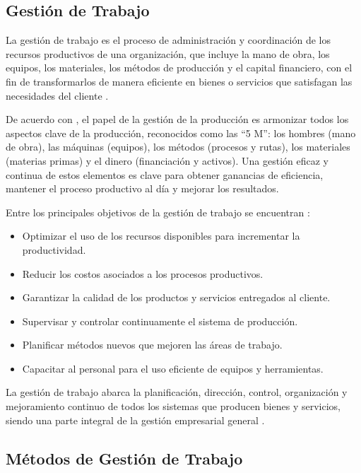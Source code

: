\documentclass[12pt, letterpaper]{article}
\begin{document}
\subsection{Gestión de Trabajo}

La gestión de trabajo es el proceso de administración y coordinación de los recursos productivos de
una organización, que incluye la mano de obra, los equipos, los materiales, los métodos de
producción y el capital financiero, con el fin de transformarlos de manera eficiente en bienes o
servicios que satisfagan las necesidades del cliente \cite{mrpeasy2023}.

De acuerdo con \cite{mrpeasy2023}, el papel de la gestión de la producción es armonizar todos los
aspectos clave de la producción, reconocidos como las ``5 M'': los hombres (mano de obra), las
máquinas (equipos), los métodos (procesos y rutas), los materiales (materias primas) y el dinero
(financiación y activos). Una gestión eficaz y continua de estos elementos es clave para obtener
ganancias de eficiencia, mantener el proceso productivo al día y mejorar los resultados.

Entre los principales objetivos de la gestión de trabajo se encuentran \cite{mrpeasy2023,webyempresas2022}:

\begin{itemize}[leftmargin=1.5em, itemsep=2pt]
  \item Optimizar el uso de los recursos disponibles para incrementar la productividad.
  \item Reducir los costos asociados a los procesos productivos.
  \item Garantizar la calidad de los productos y servicios entregados al cliente.
  \item Supervisar y controlar continuamente el sistema de producción.
  \item Planificar métodos nuevos que mejoren las áreas de trabajo.
  \item Capacitar al personal para el uso eficiente de equipos y herramientas.
\end{itemize}

La gestión de trabajo abarca la planificación, dirección, control, organización y mejoramiento
continuo de todos los sistemas que producen bienes y servicios, siendo una parte integral de la
gestión empresarial general \cite{webyempresas2022}.

\subsection{Métodos de Gestión de Trabajo}
\end{document}
